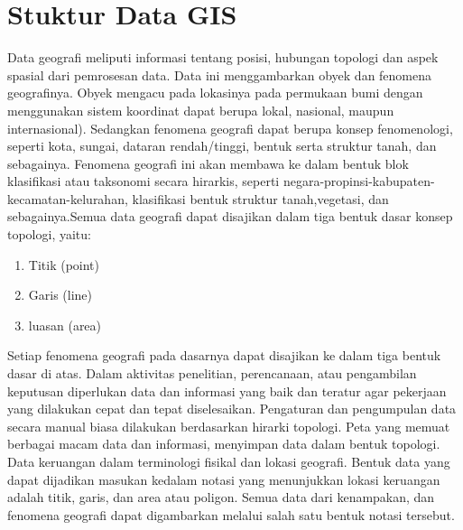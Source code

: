 \section{Stuktur Data GIS}
Data geografi meliputi informasi tentang posisi, hubungan topologi dan aspek spasial dari pemrosesan data. Data ini menggambarkan obyek dan fenomena geografinya. Obyek mengacu pada lokasinya pada permukaan bumi dengan menggunakan sistem koordinat dapat berupa lokal, nasional, maupun internasional). Sedangkan fenomena geografi dapat berupa konsep fenomenologi, seperti kota, sungai, dataran rendah/tinggi, bentuk serta struktur tanah, dan sebagainya. Fenomena geografi ini akan membawa ke dalam bentuk blok klasifikasi atau taksonomi secara hirarkis, seperti negara-propinsi-kabupaten-kecamatan-kelurahan, klasifikasi bentuk struktur tanah,vegetasi, dan sebagainya.Semua data geografi dapat disajikan dalam tiga bentuk dasar konsep topologi, yaitu:
\begin{enumerate}
\item Titik (point)
\item Garis (line)
\item luasan (area)
\end{enumerate}

Setiap fenomena geografi pada dasarnya dapat disajikan ke dalam tiga bentuk dasar di atas. Dalam aktivitas penelitian, perencanaan, atau pengambilan keputusan diperlukan data dan informasi yang baik dan teratur agar pekerjaan yang dilakukan  cepat dan tepat diselesaikan. Pengaturan dan pengumpulan data secara manual biasa dilakukan berdasarkan hirarki topologi. Peta yang memuat berbagai macam data dan informasi, menyimpan data dalam bentuk topologi. Data keruangan dalam terminologi fisikal dan lokasi geografi. Bentuk data yang dapat dijadikan masukan kedalam notasi yang menunjukkan lokasi keruangan adalah titik, garis, dan area atau poligon. Semua data dari kenampakan, dan fenomena geografi dapat digambarkan melalui salah satu bentuk notasi tersebut.

